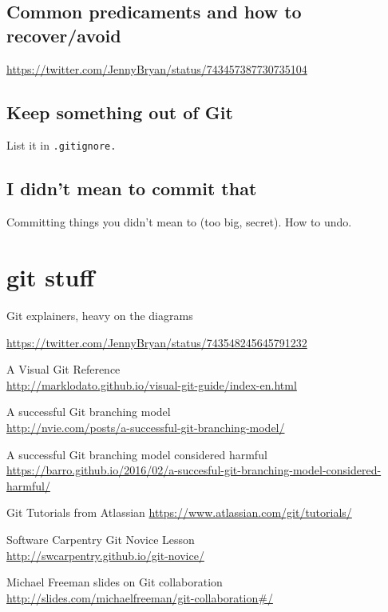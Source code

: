 \documentclass[
]{book}
\begin{document}
\subsection{Common predicaments and how to recover/avoid}\label{common-predicaments-and-how-to-recoveravoid}

\url{https://twitter.com/JennyBryan/status/743457387730735104}

\subsection{Keep something out of Git}\label{keep-something-out-of-git}

List it in \texttt{.gitignore.}

\subsection{I didn't mean to commit that}\label{i-didnt-mean-to-commit-that}

Committing things you didn't mean to (too big, secret). How to undo.

\section{git stuff}\label{git-stuff}

Git explainers, heavy on the diagrams

\url{https://twitter.com/JennyBryan/status/743548245645791232}

A Visual Git Reference\\
\url{http://marklodato.github.io/visual-git-guide/index-en.html}

A successful Git branching model\\
\url{http://nvie.com/posts/a-successful-git-branching-model/}

A successful Git branching model considered harmful\\
\url{https://barro.github.io/2016/02/a-succesful-git-branching-model-considered-harmful/}

Git Tutorials from Atlassian
\url{https://www.atlassian.com/git/tutorials/}

Software Carpentry Git Novice Lesson\\
\url{http://swcarpentry.github.io/git-novice/}

Michael Freeman slides on Git collaboration\\
\url{http://slides.com/michaelfreeman/git-collaboration\#/}
\end{document}
